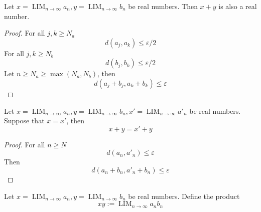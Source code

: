 \documentclass{blog}
\DeclareMathOperator{\LIM}{LIM}
\begin{document}
\begin{lemma}
  Let $x = \LIM_{n \to \infty} a_{n}, y = \LIM_{n \to \infty} b_{n}$ be real numbers.
  Then $x + y$ is also a real number.
\end{lemma}

\begin{proof}
  For all $j, k \geq N_{a}$
  \begin{equation*}
    d(a_{j}, a_{k}) \leq \varepsilon / 2
  \end{equation*}
  For all $j, k \geq N_{b}$
  \begin{equation*}
    d(b_{j}, b_{k}) \leq \varepsilon / 2
  \end{equation*}
  Let $n \geq N_{a} \geq \max(N_{a}, N_{b})$, then
  \begin{equation*}
    d(a_{j} + b_{j}, a_{k} + b_{k}) \leq \varepsilon
  \end{equation*}
\end{proof}

\begin{lemma}
  Let $x = \LIM_{n \to \infty} a_{n}, y = \LIM_{n \to \infty} b_{n}, x' = \LIM_{n \to \infty} a'_{n}$
  be real numbers.
  Suppose that $x = x'$, then
  \begin{equation}
    x + y = x' + y
  \end{equation}
\end{lemma}

\begin{proof}
  For all $n \geq N$
  \begin{equation*}
    d(a_{n}, a'_{n}) \leq \varepsilon
  \end{equation*}
  Then
  \begin{equation*}
    d(a_{n} + b_{n}, a'_{n} + b_{n}) \leq \varepsilon
  \end{equation*}
\end{proof}

\begin{definition}[multiplication]
  Let $x = \LIM_{n \to \infty} a_{n}, y = \LIM_{n \to \infty} b_{n}$ be real numbers.
  Define the product
  \begin{equation*}
    x y := \LIM_{n \to \infty} a_{n} b_{n}
  \end{equation*}
\end{definition}
\end{document}
